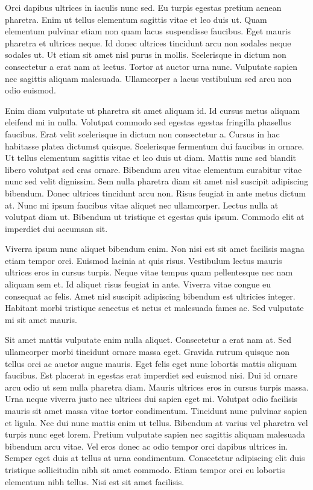 \documentclass[11pt,a4paper]{article}
\begin{document}
Orci dapibus ultrices in iaculis nunc sed. Eu turpis egestas pretium aenean pharetra. Enim ut tellus elementum sagittis vitae et leo duis ut. Quam elementum pulvinar etiam non quam lacus suspendisse faucibus. Eget mauris pharetra et ultrices neque. Id donec ultrices tincidunt arcu non sodales neque sodales ut. Ut etiam sit amet nisl purus in mollis. Scelerisque in dictum non consectetur a erat nam at lectus. Tortor at auctor urna nunc. Vulputate sapien nec sagittis aliquam malesuada. Ullamcorper a lacus vestibulum sed arcu non odio euismod.

Enim diam vulputate ut pharetra sit amet aliquam id. Id cursus metus aliquam eleifend mi in nulla. Volutpat commodo sed egestas egestas fringilla phasellus faucibus. Erat velit scelerisque in dictum non consectetur a. Cursus in hac habitasse platea dictumst quisque. Scelerisque fermentum dui faucibus in ornare. Ut tellus elementum sagittis vitae et leo duis ut diam. Mattis nunc sed blandit libero volutpat sed cras ornare. Bibendum arcu vitae elementum curabitur vitae nunc sed velit dignissim. Sem nulla pharetra diam sit amet nisl suscipit adipiscing bibendum. Donec ultrices tincidunt arcu non. Risus feugiat in ante metus dictum at. Nunc mi ipsum faucibus vitae aliquet nec ullamcorper. Lectus nulla at volutpat diam ut. Bibendum ut tristique et egestas quis ipsum. Commodo elit at imperdiet dui accumsan sit.

Viverra ipsum nunc aliquet bibendum enim. Non nisi est sit amet facilisis magna etiam tempor orci. Euismod lacinia at quis risus. Vestibulum lectus mauris ultrices eros in cursus turpis. Neque vitae tempus quam pellentesque nec nam aliquam sem et. Id aliquet risus feugiat in ante. Viverra vitae congue eu consequat ac felis. Amet nisl suscipit adipiscing bibendum est ultricies integer. Habitant morbi tristique senectus et netus et malesuada fames ac. Sed vulputate mi sit amet mauris.

Sit amet mattis vulputate enim nulla aliquet. Consectetur a erat nam at. Sed ullamcorper morbi tincidunt ornare massa eget. Gravida rutrum quisque non tellus orci ac auctor augue mauris. Eget felis eget nunc lobortis mattis aliquam faucibus. Est placerat in egestas erat imperdiet sed euismod nisi. Dui id ornare arcu odio ut sem nulla pharetra diam. Mauris ultrices eros in cursus turpis massa. Urna neque viverra justo nec ultrices dui sapien eget mi. Volutpat odio facilisis mauris sit amet massa vitae tortor condimentum. Tincidunt nunc pulvinar sapien et ligula. Nec dui nunc mattis enim ut tellus. Bibendum at varius vel pharetra vel turpis nunc eget lorem. Pretium vulputate sapien nec sagittis aliquam malesuada bibendum arcu vitae. Vel eros donec ac odio tempor orci dapibus ultrices in. Semper eget duis at tellus at urna condimentum. Consectetur adipiscing elit duis tristique sollicitudin nibh sit amet commodo. Etiam tempor orci eu lobortis elementum nibh tellus. Nisi est sit amet facilisis.
\end{document}
